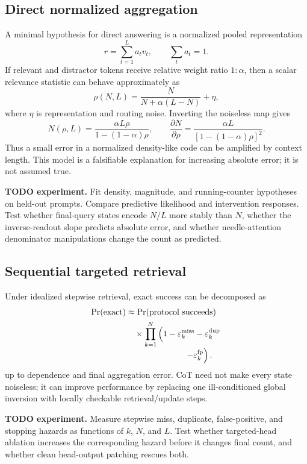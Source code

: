 \documentclass[10pt,twocolumn]{article}
\newcommand{\todoexp}[1]{%
  \par\noindent\textcolor{red!75!black}{\textbf{TODO experiment.} #1}\par}
\newcommand{\eps}{\varepsilon}
\begin{document}
\subsection{Direct normalized aggregation}
A minimal hypothesis for direct answering is a normalized pooled representation
\[
    r=\sum_{t=1}^L a_t v_t,\qquad \sum_t a_t=1.
\]
If relevant and distractor tokens receive relative weight ratio $1:\alpha$, then a scalar
relevance statistic can behave approximately as
\[
    \rho(N,L)
    =\frac{N}{N+\alpha(L-N)}+\eta,
\]
where $\eta$ is representation and routing noise. Inverting the noiseless map gives
\[
    N(\rho,L)
    =\frac{\alpha L\rho}{1-(1-\alpha)\rho},
    \qquad
    \frac{\partial N}{\partial\rho}
    =\frac{\alpha L}
    {[1-(1-\alpha)\rho]^2}.
\]
Thus a small error in a normalized density-like code can be amplified by context length.
This model is a falsifiable explanation for increasing absolute error; it is not assumed true.

\todoexp{Fit density, magnitude, and running-counter hypotheses on held-out prompts.
Compare predictive likelihood and intervention responses. Test whether final-query states encode
$N/L$ more stably than $N$, whether the inverse-readout slope predicts absolute error, and whether
needle-attention denominator manipulations change the count as predicted.}

\subsection{Sequential targeted retrieval}
Under idealized stepwise retrieval, exact success can be decomposed as
\[
\begin{aligned}
\Pr(\text{exact})
&\approx \Pr(\text{protocol succeeds})\\
&\quad\times
\prod_{k=1}^{N}
\left(1-\eps_k^{\mathrm{miss}}
        -\eps_k^{\mathrm{dup}}\right.\\[-1mm]
&\hspace{7.0em}\left.
        -\eps_k^{\mathrm{fp}}\right).
\end{aligned}
\]
up to dependence and final aggregation error. CoT need not make every state noiseless; it can
improve performance by replacing one ill-conditioned global inversion with locally checkable
retrieval/update steps.

\todoexp{Measure stepwise miss, duplicate, false-positive, and stopping hazards as functions of
$k$, $N$, and $L$. Test whether targeted-head ablation increases the corresponding hazard before
it changes final count, and whether clean head-output patching rescues both.}
\end{document}
